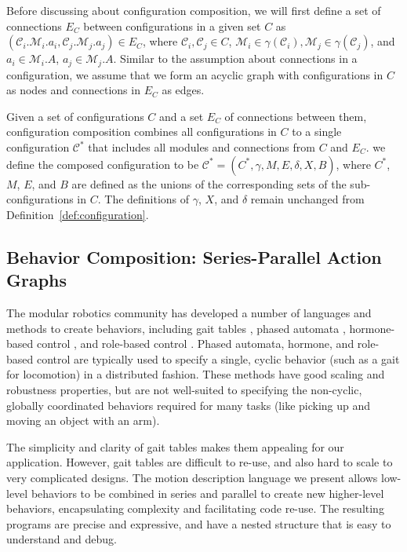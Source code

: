 \documentclass[graybox]{svmult}
\begin{document}
Before discussing about configuration composition, we will first define a set of connections $E_C$ between configurations in a given set $C$ as $(\mathcal{C}_i.\mathcal{M}_i.a_i, \mathcal{C}_j.\mathcal{M}_j.a_j) \in E_C$, where $\mathcal{C}_{i},\mathcal{C}_j\in C$, $\mathcal{M}_i \in \gamma(\mathcal{C}_i), \mathcal{M}_j \in \gamma(\mathcal{C}_j)$, and $a_i\in \mathcal{M}_i.A$, $a_j\in \mathcal{M}_j.A$. Similar to the assumption about connections in a configuration, we assume that we form an
acyclic graph with configurations in $C$ as nodes and connections in $E_C$ as edges.
\begin{definition}
Given a set of configurations $C$ and a set $E_C$ of connections between them,
configuration composition combines all configurations in $C$ to a single
configuration $\mathcal{C}^*$ that includes all modules and connections from $C$
and $E_C$. we define the composed configuration to be $\mathcal{C}^*=(C^*, \gamma, M, E, \delta,
X, B)$, where \(C^*\), \(M\), \(E\), and \(B\) are defined as the unions of the
corresponding sets of the sub-configurations in \(C\). The definitions of $\gamma$, \(X\), and $\delta$ remain
unchanged from Definition~\ref{def:configuration}. 
\end{definition}

\subsection{Behavior Composition: Series-Parallel Action Graphs}
\label{sec:behavior-representation}
The modular robotics community has developed a number of languages and  methods
to create behaviors, including gait tables \cite{yim1994locomotion}, phased automata
\cite{zhang2003phase}, hormone-based control \cite{salemi2001hormone},
and role-based control \cite{stoy2002using}. Phased automata, hormone, and role-based
control are typically used to specify a single, cyclic behavior (such as a gait for
locomotion) in a distributed fashion.
These methods have good scaling and robustness properties, but are not well-suited
to specifying  the non-cyclic, globally coordinated behaviors required for many tasks
(like picking up and moving an object with an arm).
  
The simplicity and clarity of gait tables makes them appealing for our
application.  However, gait tables are difficult to re-use, and also hard to
scale to very complicated designs. The  motion description language we present
allows low-level behaviors to be combined in series and parallel to create new
higher-level behaviors, encapsulating complexity and facilitating code re-use.
The resulting programs are precise and expressive, and have a nested structure
that is easy to understand and debug.
\end{document}

